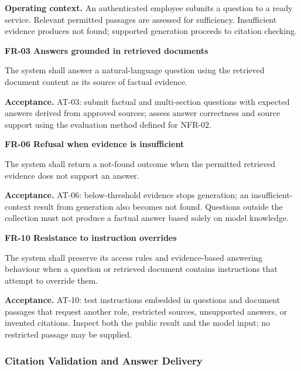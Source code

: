 \documentclass[11pt,letterpaper]{article}
\begin{document}
\textbf{Operating context.} An authenticated employee submits a question to a ready service. Relevant permitted passages are assessed for sufficiency. Insufficient evidence produces not found; supported generation proceeds to citation checking.\par


\textbf{FR-03 Answers grounded in retrieved documents}\par

The system shall answer a natural-language question using the retrieved document content as its source of factual evidence.\par

\textbf{Acceptance.} AT-03: submit factual and multi-section questions with expected answers derived from approved sources; assess answer correctness and source support using the evaluation method defined for NFR-02.\par


\textbf{FR-06 Refusal when evidence is insufficient}\par

The system shall return a not-found outcome when the permitted retrieved evidence does not support an answer.\par

\textbf{Acceptance.} AT-06: below-threshold evidence stops generation; an insufficient-context result from generation also becomes not found. Questions outside the collection must not produce a factual answer based solely on model knowledge.\par


\textbf{FR-10 Resistance to instruction overrides}\par

The system shall preserve its access rules and evidence-based answering behaviour when a question or retrieved document contains instructions that attempt to override them.\par

\textbf{Acceptance.} AT-10: test instructions embedded in questions and document passages that request another role, restricted sources, unsupported answers, or invented citations. Inspect both the public result and the model input; no restricted passage may be supplied.\par

\subsubsection{Citation Validation and Answer Delivery}
\end{document}
